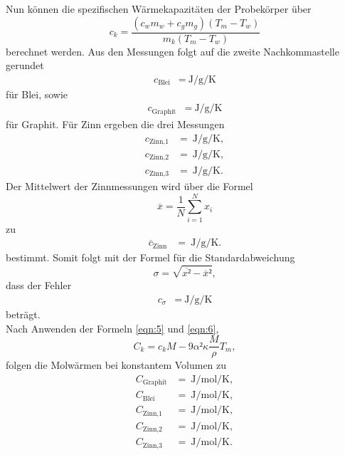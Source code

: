 Nun können die spezifischen Wärmekapazitäten der Probekörper über
\begin{equation}
  c_k = \frac{(c_wm_w+c_gm_g)(T_m-T_w)}{m_k(T_m-T_w)}
\end{equation}
berechnet werden.
Aus den Messungen folgt auf die zweite Nachkommastelle gerundet
\begin{align}
  c_{\text{Blei}} &= \: \si{\joule\per\gram\per\kelvin} \label{Bleiwert:c}
\end{align}
für Blei, sowie
\begin{align}
  c_{\text{Graphit}} &= \: \si{\joule\per\gram\per\kelvin} \label{Bullseye:c}
\end{align}
für Graphit.
Für Zinn ergeben die drei Messungen
\begin{align}
  c_{\text{Zinn,1}} &= \: \si{\joule\per\gram\per\kelvin} \label{Kackwert:c},\\
  c_{\text{Zinn,2}} &= \: \si{\joule\per\gram\per\kelvin},\\
  c_{\text{Zinn,3}} &= \: \si{\joule\per\gram\per\kelvin}.
\end{align}
Der Mittelwert der Zinnmessungen wird über die Formel
\begin{equation}
  \overline{x} = \frac{1}{N} \sum_{i=1}^N x_i \label{eqn:9}
\end{equation}
zu
\begin{align}
  \overline{c}_{\text{Zinn}} &= \: \si{\joule\per\gram\per\kelvin}.
\end{align}
bestimmt.
Somit folgt mit der Formel für die Standardabweichung
\begin{equation}
  \sigma = \sqrt{\overline{x²}-\overline{x}²} \label{eqn:10},
\end{equation}
dass der Fehler
\begin{align}
  c_{\sigma} &= \: \si{\joule\per\gram\per\kelvin}
\end{align}
beträgt.\\
Nach Anwenden der Formeln \ref{eqn:5} und \ref{eqn:6},
\begin{equation}
  C_k = c_k M - 9\alpha² \kappa \frac{M}{\rho} T_m,
\end{equation}
folgen die Molwärmen bei konstantem Volumen zu
\begin{align}
  C_{\text{Graphit}} &= \: \si{\joule\per\mol\per\kelvin} \label{Bullseye:C},\\
  C_{\text{Blei}}    &= \: \si{\joule\per\mol\per\kelvin} \label{Bleiwert:C},\\
  C_{\text{Zinn,1}}  &= \: \si{\joule\per\mol\per\kelvin} \label{Kackwert:C},\\
  C_{\text{Zinn,2}}  &= \: \si{\joule\per\mol\per\kelvin},\\
  C_{\text{Zinn,3}}  &= \: \si{\joule\per\mol\per\kelvin}.
\end{align}
